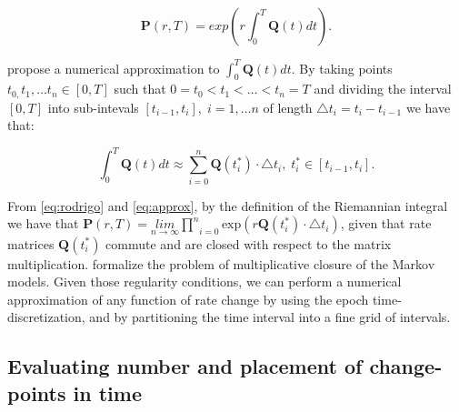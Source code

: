 \begin{equation}
\ensuremath{\mathbf{P}}(r,T)=exp\left(r\int_{0}^{T}\mathbf{Q}(t)dt\right).\label{eq:rodrigo}
\end{equation}

\noindent
\citet{Rodrigo2008} propose a numerical approximation to $\int_{0}^{T}\mathbf{Q}(t)dt$. 
By taking points $t_{0,}t_{1},\ldots t_{n}\in[0,T]$ such that $0=t_{0}<t_{1}<\ldots<t_{n}=T$ and dividing the interval $\left[0,T\right]$ into sub-intevals $\left[t_{i-1},t_{i}\right],\; i=1,\ldots n$ of length $\triangle t_{i}=t_{i}-t_{i-1}$ we have that:   

\begin{equation}
\int_{0}^{T}\mathbf{Q}(t)dt\approx\underset{i=0}{\overset{n}{\sum}}\mathbf{Q}(t_{i}^{*})\cdot\triangle t_{i},\; t_{i}^{*}\in[t_{i-1},t_{i}].\label{eq:approx}
\end{equation}

\noindent
From \ref{eq:rodrigo} and \ref{eq:approx}, by the definition of the Riemannian integral we have that $\mathbf{P}(r,T)=\underset{n\rightarrow\infty}{lim}\underset{i=0}{\overset{n}{\prod}}\text{exp}\left(r\mathbf{Q}(t_{i}^{*})\cdot\triangle t_{i}\right)$, given that rate matrices $\mathbf{Q}(t_{i}^{*})$ commute 
and are closed with respect to the matrix multiplication.
\citet{Sumner2012} formalize the problem of multiplicative closure of the Markov models. 
Given those regularity conditions, we can perform a numerical approximation of any function of rate change by using the epoch time-discretization, and by partitioning the time interval into a fine grid of intervals. 

\subsection{Evaluating number and placement of change-points in time}

